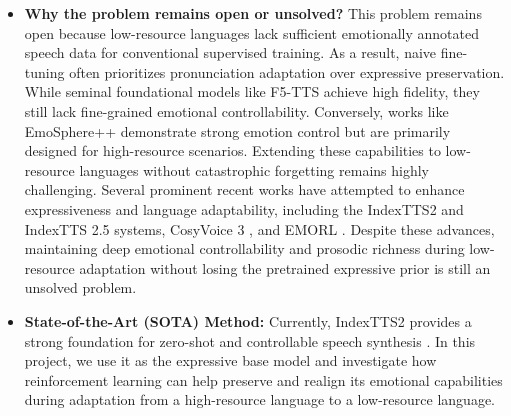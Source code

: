 \begin{itemize}
    \item \textbf{Why the problem remains open or unsolved?} 
    This problem remains open because low-resource languages lack sufficient emotionally annotated speech data for conventional supervised training. As a result, naive fine-tuning often prioritizes pronunciation adaptation over expressive preservation. While seminal foundational models like F5-TTS \citep{chen-etal-2025-f5} achieve high fidelity, they still lack fine-grained emotional controllability. Conversely, works like EmoSphere++ \citep{Cho2024EmoSphereEZ} demonstrate strong emotion control but are primarily designed for high-resource scenarios. Extending these capabilities to low-resource languages without catastrophic forgetting remains highly challenging. Several prominent recent works have attempted to enhance expressiveness and language adaptability, including the IndexTTS2 \citep{Zhou2025IndexTTS2AB} and IndexTTS 2.5 \citep{2026arXiv260103888L} systems, CosyVoice 3 \citep{2025arXiv250517589D}, and EMORL \citep{2025arXiv251005758L}. Despite these advances, maintaining deep emotional controllability and prosodic richness during low-resource adaptation without losing the pretrained expressive prior is still an unsolved problem.
    
    \item \textbf{State-of-the-Art (SOTA) Method:} 
    Currently, IndexTTS2 provides a strong foundation for zero-shot and controllable speech synthesis \citep{Zhou2025IndexTTS2AB}. In this project, we use it as the expressive base model and investigate how reinforcement learning can help preserve and realign its emotional capabilities during adaptation from a high-resource language to a low-resource language.
\end{itemize}

